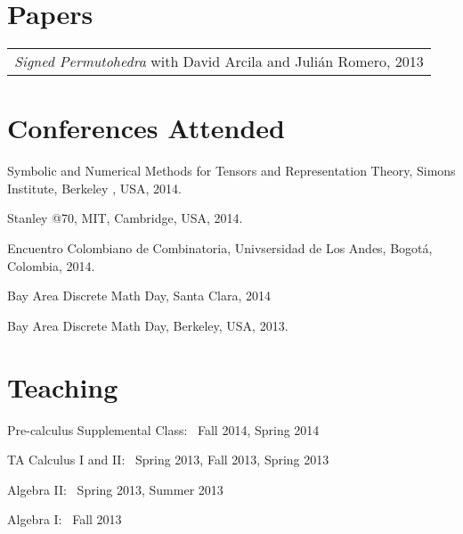\documentclass[margin,line,pifont,palatino,courier]{res}
\newenvironment{list1}{
  \begin{list}{\label{}}{%
      \setlength{\itemsep}{0in}
      \setlength{\parsep}{0in} \setlength{\parskip}{0in}
      \setlength{\topsep}{0in} \setlength{\partopsep}{0in}
      \setlength{\leftmargin}{0.0in}}}{\end{list}}
\begin{document}
\begin{resume}







\section{\sc Papers}
\begin{tabular}{@{}p{5in}}
    {\em Signed Permutohedra} with David Arcila and Juli\'an Romero, 2013
\end{tabular}






\section{\sc Conferences Attended}
\begin{list1}
\item Symbolic and Numerical Methods for Tensors and Representation Theory, Simons Institute, Berkeley , USA, 2014.
\item  Stanley @70, MIT, Cambridge, USA, 2014.
\item Encuentro Colombiano de Combinatoria, Univsersidad de Los Andes, Bogot\'a, Colombia, 2014.
\item Bay Area Discrete Math Day, Santa Clara, 2014
\item  Bay Area Discrete Math Day, Berkeley, USA, 2013.
\end{list1}






\section{\sc  Teaching}
\begin{list1}
\item Pre-calculus Supplemental Class: \ Fall 2014, Spring 2014
\item  TA Calculus I and II: \ Spring 2013, Fall 2013, Spring 2013
\item Algebra II: \ Spring 2013, Summer 2013
\item Algebra I: \ Fall 2013
\end{list1}



\end{resume}
\end{document}
